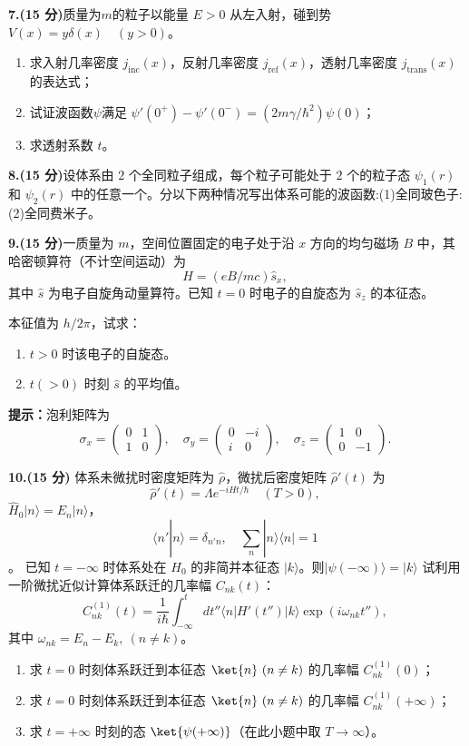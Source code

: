 \textbf{7.(15 分)}质量为$m$的粒子以能量 $E > 0$ 从左入射，碰到势 $V(x) = y\delta(x) \quad (y > 0)$。

\begin{enumerate}
    \item 求入射几率密度 $j_{\text{inc}}(x)$，反射几率密度 $j_{\text{ref}}(x)$，透射几率密度 $j_{\text{trans}}(x)$ 的表达式；
    \item 试证波函数$\psi$满足 $\psi'(0^+) - \psi'(0^-) = \left(2m\gamma/\hbar^2\right) \psi(0)$；
    \item 求透射系数 $t$。
\end{enumerate}

\textbf{8.(15 分)}设体系由 $2$ 个全同粒子组成，每个粒子可能处于 $2$ 个的粒子态 $\psi_1(r)$ 和 $\psi_2(r)$ 中的任意一个。分以下两种情况写出体系可能的波函数:(1)全同玻色子:(2)全同费米子。

\textbf{9.(15 分)}一质量为 $m$，空间位置固定的电子处于沿 $x$ 方向的均匀磁场 $B$ 中，其哈密顿算符（不计空间运动）为
$$H = \left( eB/mc \right) \hat{s}_x,~$$
其中 $\hat{s}$ 为电子自旋角动量算符。已知 $t = 0$ 时电子的自旋态为 $\hat{s}_z$ 的本征态。

本征值为 $h/2\pi$，试求：
\begin{enumerate}
    \item $t > 0$ 时该电子的自旋态。
    \item $t(> 0)$ 时刻 $\hat{s}$ 的平均值。
\end{enumerate}

\textbf{提示：}泡利矩阵为
$$\sigma_x = \begin{pmatrix} 0 & 1 \\ 1 & 0 \end{pmatrix}, \quad \sigma_y = \begin{pmatrix} 0 & -i \\ i & 0 \end{pmatrix}, \quad \sigma_z = \begin{pmatrix} 1 & 0 \\ 0 & -1 \end{pmatrix}.~$$

\textbf{10.(15 分)} 体系未微扰时密度矩阵为 $\hat{\rho}$，微扰后密度矩阵 $\hat{\rho}'(t)$ 为
$$\hat{\rho}'(t) = \Lambda e^{-iHt/\hbar} \quad (T > 0),~$$
$\hat{H}_0 \lvert n \rangle = E_n \lvert n \rangle$，
$$\langle n' | n \rangle = \delta_{n'n}, \quad \sum_n |n\rangle \langle n| = 1~$$。
已知 $t = -\infty$ 时体系处在 $H_0$ 的非简并本征态 $\lvert k \rangle$。则$\lvert \psi(-\infty) \rangle = \lvert k \rangle$  试利用一阶微扰近似计算体系跃迁的几率幅 $C_{nk}(t)$： 
$$C_{nk}^{(1)}(t) = \frac{1}{i\hbar} \int_{-\infty}^{t} dt'' \langle n|H'(t'')|k\rangle \exp(i\omega_{nk}t''),~$$ 其中 $\omega_{nk} = E_n - E_k, \ (n \neq k)$。
\begin{enumerate}
        \item 求 $t = 0$ 时刻体系跃迁到本征态 $\ket{n} \ (n \neq k) $ 的几率幅 $C_{nk}^{(1)}(0)$；
        \item 求 $t = 0$ 时刻体系跃迁到本征态 $\ket{n} \ (n \neq k)$ 的几率幅 $C_{nk}^{(1)}(+\infty)$；
        \item 求 $t = +\infty$ 时刻的态 $ \ket{\psi(+\infty)} $（在此小题中取 $T \to \infty$）。
    \end{enumerate}